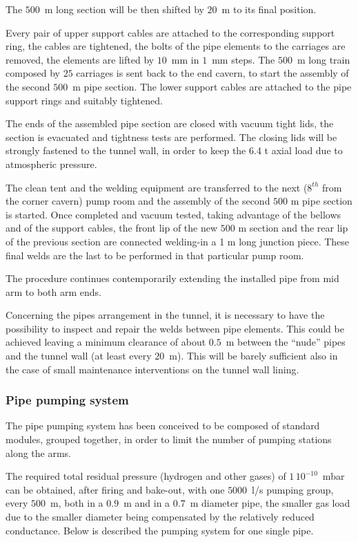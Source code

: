 The $500$~m long section will be then shifted by $20$~m to its final position. 

Every pair of upper support cables are attached to the corresponding support ring, the cables are tightened, the bolts of the pipe elements to the carriages are removed, the elements are lifted by $10$~mm in $1$~mm steps. The $500$~m long train composed by $25$ carriages is sent back to the end cavern, to start the assembly of the second $500$~m pipe section. The lower support cables are attached to the pipe support rings and suitably tightened. 

The ends of the assembled pipe section are closed with vacuum tight lids, the section is evacuated and tightness tests are performed. The closing lids will be strongly fastened to the tunnel wall, in order to keep the 6.4 t axial load due to atmospheric pressure. 

The clean tent and the welding equipment are transferred to the next ($8^{th}$ from the corner cavern) pump room and the assembly of the second $500$ m pipe section is started. Once completed and vacuum tested, taking advantage of the bellows and of the support cables, the front lip of the new $500$ m section and the rear lip of the previous section are connected welding-in a 1 m long junction piece. These final welds are the last to be performed in that particular pump room. 

The procedure continues contemporarily extending the installed pipe from mid arm to both arm ends. 

Concerning the pipes arrangement in the tunnel, it is necessary to have the possibility to inspect and repair the welds between pipe elements. This could be achieved leaving a minimum clearance of about $0.5$~m between the ``nude'' pipes and the tunnel wall (at least every $20$~m). This will be barely sufficient also in the case of small maintenance interventions on the tunnel wall lining. 

\subsubsection{Pipe pumping system} 
The pipe pumping system has been conceived to be composed of standard modules, grouped together, in order to limit the number of pumping stations along the arms. 

The required total residual pressure (hydrogen and other gases) of $1\,10^{-10}$~mbar can be obtained, after firing and bake-out, with one $5000$~l/s pumping group, every $500$~m, both in a $0.9$~m and in a $0.7$~m diameter pipe, the smaller gas load due to the smaller diameter being compensated by the relatively reduced conductance. Below is described the pumping system for one single pipe. 

